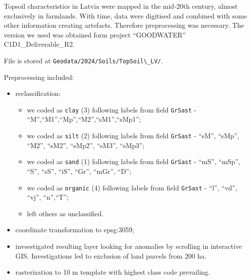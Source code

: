 \documentclass[
]{book}
\newcommand{\passthrough}[1]{#1}
\begin{document}
Topsoil characteristics in Latvia were mapped in the mid-20th century, almost
exclusively in farmlands. With time, data were digitised and combined with some
other information creating artefacts. Therefore preprocessing was necessary. The
version we used was obtained form project ``GOODWATER'' C1D1\_Deliverable\_R2.

File is stored at \passthrough{\lstinline!Geodata/2024/Soils/TopSoil\_LV/!}.

Preprocessing included:

\begin{itemize}
\item
  reclassification:

  \begin{itemize}
  \item
    we coded as \passthrough{\lstinline!clay!} (3) following labels from field \passthrough{\lstinline!GrSast!} - ``M'',``M1'',``Mp'',``M2'',``sM1'',``sMp1'';
  \item
    we coded as \passthrough{\lstinline!silt!} (2) following labels from field \passthrough{\lstinline!GrSast!} - ``sM'', ``sMp'', ``M2'', ``sM2'', ``sMp2'', ``sM3'', ``sMp3'';
  \item
    we coded as \passthrough{\lstinline!sand!} (1) following labels from field \passthrough{\lstinline!GrSast!} - ``mS'', ``mSp'', ``S'', ``sS'', ``iS'', ``Gr'', ``mGr'', ``D'';
  \item
    we coded as \passthrough{\lstinline!organic!} (4) following labels from field \passthrough{\lstinline!GrSast!} - ``l'', ``vd'', ``vj'', ``n'',``T'';
  \item
    left others as unclassified.
  \end{itemize}
\item
  coordinate transformation to epsg:3059;
\item
  invsestigated resulting layer looking for anomalies by scrolling in interactive
  GIS. Investigations led to exclusion of land parcels from 200 ha.
\item
  rasterization to 10 m template with highest class code prevailing.
\end{itemize}
\end{document}

